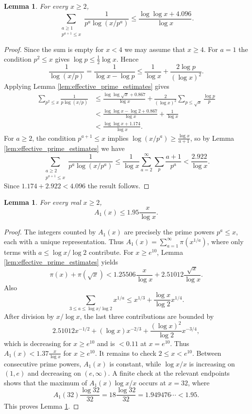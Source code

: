 \documentclass[12pt,a4paper,reqno]{amsart}
\theoremstyle{plain}
\newtheorem{lmm}[thrm]{Lemma}
\numberwithin{sblmm}{thrm}
\numberwithin{equation}{section}
\begin{document}
\begin{lmm}\label{lem:effective_1}
  For every $x\ge 2$,
  $$\sum_{\substack{a\ge 1\\ p^{a+1}\le x}}\frac{1}{p^a\log(x/p^a)}\le\frac{\log\log x+4.096}{\log x}.$$
\end{lmm}
\begin{proof}
    Since the sum is empty for $x<4$ we may assume that $x\ge 4$. For $a=1$ the condition $p^2\le x$ gives $\log p\le\frac{1}{2}\log x$. Hence
    $$\frac{1}{\log(x/p)}=\frac{1}{\log x-\log p}\le\frac{1}{\log x}+\frac{2\log p}{(\log x)^2}.$$
    Applying Lemma \ref{lem:effective_prime_estimates} gives
    \begin{align*}
        \sum_{p^2\le x}\frac{1}{p\log(x/p)}&\le\frac{\log\log\sqrt{x}+0.867}{\log x}+\frac{2}{(\log x)^2}\sum_{p\le\sqrt{x}}\frac{\log p}{p}\\
        &<\frac{\log\log x-\log 2+0.867}{\log x}+\frac{1}{\log x}\\
        &<\frac{\log\log x+1.174}{\log x}.
    \end{align*}
    For $a\ge 2$, the condition $p^{a+1}\le x$ implies $\log(x/p^a)\ge\frac{\log x}{a+1}$, so by Lemma \ref{lem:effective_prime_estimates} we have
    $$\sum_{\substack{a\ge 2\\ p^{a+1}\le x}}\frac{1}{p^a\log(x/p^a)}\le\frac{1}{\log x}\sum_{a=2}^{\infty}\sum_p\frac{a+1}{p^a}<\frac{2.922}{\log x}.$$
    Since $1.174+2.922<4.096$ the result follows.
\end{proof}

\begin{lmm}\label{lem:prime_powers}
   For every real $x\ge 2$,
   $$A_1(x)\le 1.95\frac{x}{\log x}.$$
\end{lmm}
\begin{proof}
    The integers counted by $A_1(x)$ are precisely the prime powers $p^a\le x$, each with a unique representation. Thus $A_1(x)=\sum_{a=1}^{\infty}\pi(x^{1/a})$, where only terms with $a\le\log x/\log 2$ contribute. For $x\ge e^{10}$, Lemma \ref{lem:effective_prime_estimates} yields
    $$\pi(x)+\pi(\sqrt{x})<1.25506\frac{x}{\log x}+2.51012\frac{\sqrt{x}}{\log x}.$$
    Also
    $$\sum_{3\le a\le \log x/\log 2}x^{1/a}\le x^{1/3}+\frac{\log x}{\log 2}x^{1/4}.$$
    After division by $x/\log x$, the last three contributions are bounded by
    $$2.51012x^{-1/2}+(\log x)x^{-2/3}+\frac{(\log x)^2}{\log 2}x^{-3/4},$$
    which is decreasing for $x\ge e^{10}$ and is $<0.11$ at $x=e^{10}$. Thus $A_1(x)<1.37\frac{x}{\log x}$ for $x\ge e^{10}$. It remains to check $2\le x<e^{10}$. Between consecutive prime powers, $A_1(x)$ is constant, while $\log x/x$ is increasing on $(1,e)$ and decreasing on $(e,\infty)$. A finite check at the relevant endpoints shows that the maximum of $A_1(x)\log x/x$ occurs at $x=32$, where
    $$A_1(32)\frac{\log 32}{32}=18\frac{\log 32}{32}=1.949476\cdots<1.95.$$
    This proves Lemma \ref{lem:prime_powers}.
\end{proof}
\end{document}
